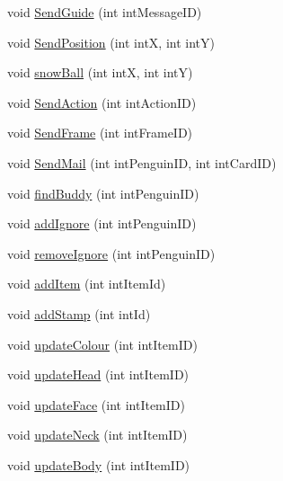 \begin{DoxyCompactItemize}
\item 
void \hyperlink{classSharpenguin_1_1Tasks_a6c32c1c6f88de4fbd9cf85f2082569dd}{\-Send\-Guide} (int int\-Message\-I\-D)
\item 
void \hyperlink{classSharpenguin_1_1Tasks_a42de1c57af7ccf4d72a4a0acef7f35fb}{\-Send\-Position} (int int\-X, int int\-Y)
\item 
void \hyperlink{classSharpenguin_1_1Tasks_a7a0a319638d008133580d51b97c6dd69}{snow\-Ball} (int int\-X, int int\-Y)
\item 
void \hyperlink{classSharpenguin_1_1Tasks_a247a2b0d766f9320292ed5b50475a8a7}{\-Send\-Action} (int int\-Action\-I\-D)
\item 
void \hyperlink{classSharpenguin_1_1Tasks_ae2befef95a890b44ce44d9add9b80608}{\-Send\-Frame} (int int\-Frame\-I\-D)
\item 
void \hyperlink{classSharpenguin_1_1Tasks_aeff19dc4bd2712ffe0fc78e7cabde77a}{\-Send\-Mail} (int int\-Penguin\-I\-D, int int\-Card\-I\-D)
\item 
void \hyperlink{classSharpenguin_1_1Tasks_a7b357b1776e1fb44c13d94ca25d329cc}{find\-Buddy} (int int\-Penguin\-I\-D)
\item 
void \hyperlink{classSharpenguin_1_1Tasks_a4f7ba17e14837328ea7d5802bf42342a}{add\-Ignore} (int int\-Penguin\-I\-D)
\item 
void \hyperlink{classSharpenguin_1_1Tasks_a1839f7c13f64f974a04d183b7d594282}{remove\-Ignore} (int int\-Penguin\-I\-D)
\item 
void \hyperlink{classSharpenguin_1_1Tasks_a3d1346d64943ff53952720b3f937f42f}{add\-Item} (int int\-Item\-Id)
\item 
void \hyperlink{classSharpenguin_1_1Tasks_a8555c5e67357445329083acf44ae7059}{add\-Stamp} (int int\-Id)
\item 
void \hyperlink{classSharpenguin_1_1Tasks_ab45a306238a875d196c3fe4ddc9d99a0}{update\-Colour} (int int\-Item\-I\-D)
\item 
void \hyperlink{classSharpenguin_1_1Tasks_a039222d09a2ed544a40947a3fd11d129}{update\-Head} (int int\-Item\-I\-D)
\item 
void \hyperlink{classSharpenguin_1_1Tasks_aa24f1d630ed91477ac4303d0ff72f7a6}{update\-Face} (int int\-Item\-I\-D)
\item 
void \hyperlink{classSharpenguin_1_1Tasks_a9fee874da71ae90e0c0f56a37d522fe8}{update\-Neck} (int int\-Item\-I\-D)
\item 
void \hyperlink{classSharpenguin_1_1Tasks_a6df07df165c03d43ed90bf818aae1f6a}{update\-Body} (int int\-Item\-I\-D)
\item 

\end{DoxyCompactItemize}
